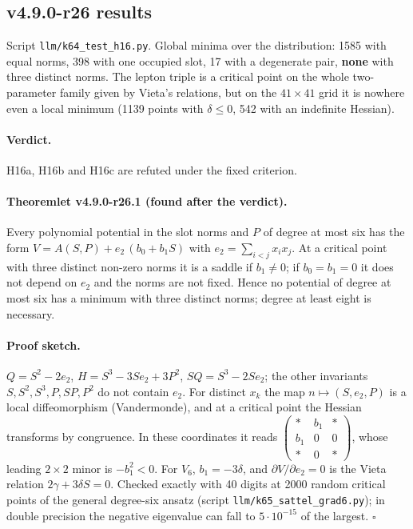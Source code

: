 \subsection*{v4.9.0-r26 results}
\label{subsec:v490-r26-results}

Script \texttt{llm/k64\_test\_h16.py}.  Global minima over the distribution: 1585 with equal norms, 398 with one occupied
slot, 17 with a degenerate pair, \textbf{none} with three distinct norms.  The lepton triple is a critical point on the
whole two-parameter family given by Vieta's relations, but on the \(41\times41\) grid it is nowhere even a local minimum
(1139 points with \(\delta\le0\), 542 with an indefinite Hessian).

\paragraph{Verdict.}
H16a, H16b and H16c are refuted under the fixed criterion.

\paragraph{Theoremlet v4.9.0-r26.1 (found after the verdict).}
Every polynomial potential in the slot norms and \(P\) of degree at most six has the form
\(V=A(S,P)+e_2\,(b_0+b_1S)\) with \(e_2=\sum_{i<j}x_ix_j\).  At a critical point with three distinct non-zero norms it is
a saddle if \(b_1\neq0\); if \(b_0=b_1=0\) it does not depend on \(e_2\) and the norms are not fixed.  Hence no potential of
degree at most six has a minimum with three distinct norms; degree at least eight is necessary.

\paragraph{Proof sketch.}
\(Q=S^2-2e_2\), \(H=S^3-3Se_2+3P^2\), \(SQ=S^3-2Se_2\); the other invariants \(S,S^2,S^3,P,SP,P^2\) do not contain
\(e_2\).  For distinct \(x_k\) the map \(n\mapsto(S,e_2,P)\) is a local diffeomorphism (Vandermonde), and at a critical
point the Hessian transforms by congruence.  In these coordinates it reads
\(\left(\begin{smallmatrix}\ast&b_1&\ast\\ b_1&0&0\\ \ast&0&\ast\end{smallmatrix}\right)\), whose leading
\(2\times2\) minor is \(-b_1^2<0\).  For \(V_6\), \(b_1=-3\delta\), and \(\partial V/\partial e_2=0\) is the Vieta relation
\(2\gamma+3\delta S=0\).  Checked exactly with 40 digits at 2000 random critical points of the general degree-six ansatz
(script \texttt{llm/k65\_sattel\_grad6.py}); in double precision the negative eigenvalue can fall to \(5\cdot10^{-15}\) of
the largest.  \(\square\)

